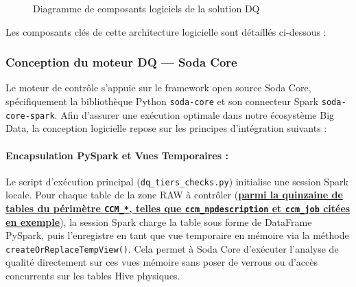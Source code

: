 \begin{figure}[H]
{
    }
    \caption{Diagramme de composants logiciels de la solution DQ}
    \label{fig:components_dq}
\end{figure}

Les composants clés de cette architecture logicielle sont détaillés ci-dessous :

\subsubsection{Conception du moteur DQ — Soda Core}
Le moteur de contrôle s'appuie sur le framework open source Soda Core, spécifiquement la bibliothèque Python \texttt{soda-core} et son connecteur Spark \texttt{soda-core-spark}. Afin d'assurer une exécution optimale dans notre écosystème Big Data, la conception logicielle repose sur les principes d'intégration suivants :

\paragraph{Encapsulation PySpark et Vues Temporaires :} Le script d'exécution principal (\texttt{dq\_tiers\_checks.py}) initialise une session Spark locale. Pour chaque table de la zone RAW à contrôler (\textbf{\uline{parmi la quinzaine de tables du périmètre \texttt{CCM\_*}, telles que \texttt{ccm\_npdescription} et \texttt{ccm\_job} citées en exemple}}), la session Spark charge la table sous forme de DataFrame PySpark, puis l'enregistre en tant que vue temporaire en mémoire via la méthode \texttt{createOrReplaceTempView()}. Cela permet à Soda Core d'exécuter l'analyse de qualité directement sur ces vues mémoire sans poser de verrous ou d'accès concurrents sur les tables Hive physiques.

